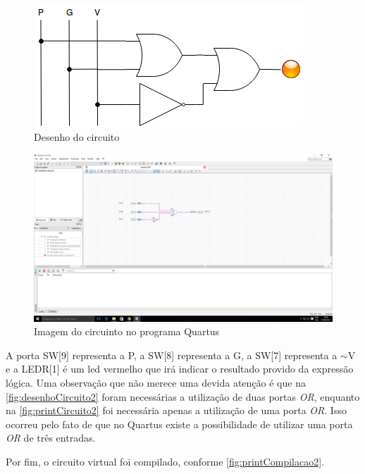 	\begin{figure}[htb]
	    \centering
		\caption{\label{fig:desenhoCircuito2}Desenho do circuito}
		\includegraphics{img/cenario2/desenhoCircuito}
	\end{figure}


	\begin{figure}[htb]
	    \centering
		\caption{\label{fig:printCircuito2}Imagem do circuinto no programa Quartus}
		\includegraphics[width=1\textwidth]{img/cenario2/printCircuito}
	\end{figure}

	A porta SW[9] representa a P, a SW[8] representa a G, a SW[7]
	 representa a $\sim$V e a LEDR[1] é um led vermelho que irá
	 indicar o resultado provido da expressão lógica. Uma observação que não merece uma devida atenção é que
	 na \autoref{fig:desenhoCircuito2} foram necessárias a utilização de duas portas \textit{OR}, enquanto na
	 \autoref{fig:printCircuito2} foi necessária apenas a utilização de uma porta \textit{OR}. Isso ocorreu pelo fato
	 de que no Quartus existe a possibilidade de utilizar uma porta \textit{OR} de três entradas.

	Por fim, o circuito virtual foi compilado, conforme \autoref{fig:printCompilacao2}.

